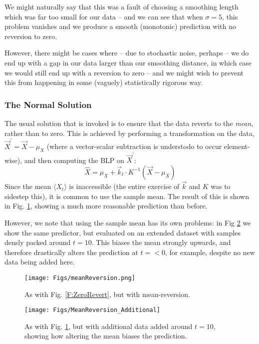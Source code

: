 \documentclass{article}
\newcounter{version}
\begin{document}
			We might naturally say that this was a fault of choosing a smoothing length which was far too small for our data -- and we can see that when $\sigma = 5$, this problem vanishes and we produce a smooth (monotonic) prediction with no reversion to zero. 

			However, there might be cases where -- due to stochastic noise, perhaps -- we do end up with a gap in our data larger than our smoothing distance, in which case we would still end up with a reversion to zero -- and we might wish to prevent this from happening in some (vaguely) statistically rigorous way. 
			
		\subsubsection*{The Normal Solution}
			The usual solution that is invoked is to ensure that the data reverts to the \textit{mean}, rather than to zero. This is achieved by performing a transformation on the data, $\vec{X}^\prime = \vec{X} - \mu_X$ (where a vector-scalar subtraction is understodo to occur element-wise), and then computing the BLP on $\vec{X}^\prime$:
			\begin{equation}
				\hat{X} = \mu_X + \vec{k}_t \cdot K^{-1} \left( \vec{X} - \mu_X\right)
			\end{equation} 
			Since the mean $\langle X_t \rangle$ is inaccessible (the entire exercise of $\vec{k}$ and $K$ was to sidestep this), it is common to use the sample mean. The result of this is shown in Fig. \ref{F:MeanRevert}, showing a much more reasonable prediction than before. 
			
			However, we note that using the sample mean has its own problems: in Fig \ref{F:MeanRevert_More} we show the same predictor, but evaluated on an extended dataset with samples densly packed around $t = 10$. This biases the mean strongly upwards, and therefore drastically alters the prediction at $t = < 0$, for example, despite no new data being added here. 

			\begin{figure}
				\texttt{[image: Figs/meanReversion.png]}
				\caption{As with Fig. \ref{F:ZeroRevert}, but with mean-reversion.}\label{F:MeanRevert}
			\end{figure}

			\begin{figure}
				\texttt{[image: Figs/MeanReversion\_Additional]}
				\caption{As with Fig. \ref{F:MeanRevert}, but with additional data added around $t=10$, showing how altering the mean biases the prediction.}\label{F:MeanRevert_More}
			\end{figure}
\end{document}
